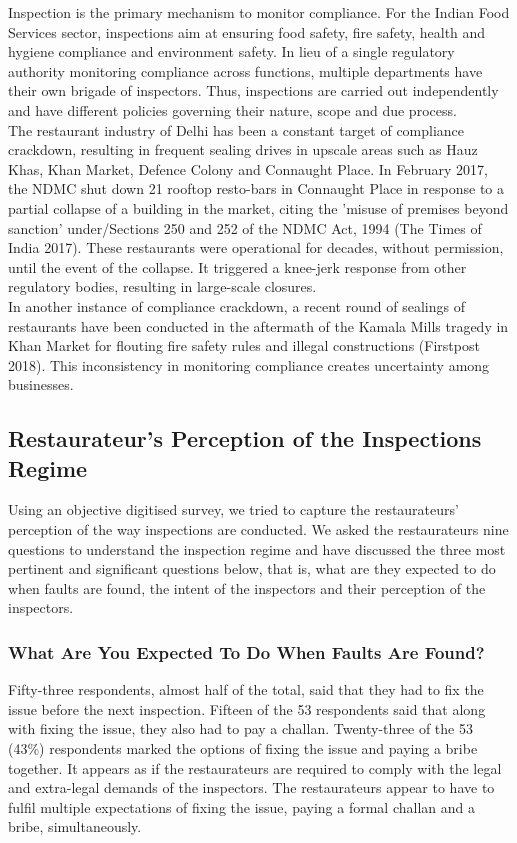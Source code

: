\documentclass[a4paper, 12pt]{article}
\begin{document}
		Inspection is the primary mechanism to monitor compliance. For the Indian Food Services sector, inspections aim at ensuring food safety, fire safety, health and hygiene compliance and environment safety. In lieu of a single regulatory authority monitoring compliance across functions, multiple departments have their own brigade of inspectors. Thus, inspections are carried out independently and have different policies governing their nature, scope and due process.\\
		The restaurant industry of Delhi has been a constant target of compliance crackdown, resulting in frequent sealing drives in upscale areas such as Hauz Khas, Khan Market, Defence Colony and Connaught Place. In February 2017, the NDMC shut down 21 rooftop resto-bars in Connaught Place in response to a partial collapse of a building in the market, citing the 'misuse of premises beyond sanction' under/Sections 250 and 252 of the NDMC Act, 1994 (The Times of India 2017). These restaurants were operational for decades, without permission, until the event of the collapse. It triggered a knee-jerk response from other regulatory bodies, resulting in large-scale closures.\\
		In another instance of compliance crackdown, a recent round of sealings of restaurants have been conducted in the aftermath of the Kamala Mills tragedy in Khan Market for flouting fire safety rules and illegal constructions (Firstpost 2018). This inconsistency in monitoring compliance creates uncertainty among businesses.
		
		\subsection{Restaurateur’s Perception of the Inspections Regime}
		Using an objective digitised survey, we tried to capture the restaurateurs’ perception of the way inspections are conducted. We asked the restaurateurs nine questions to understand the inspection regime and have discussed the three most pertinent and significant questions below, that is, what are they expected to do when faults are found, the intent of the inspectors and their perception of the inspectors.
		
		\subsubsection {What Are You Expected To Do When Faults Are Found?}
		Fifty-three respondents, almost half of the total, said that they had to fix the issue before the next inspection. Fifteen of the 53 respondents said that along with fixing the issue, they also had to pay a challan. Twenty-three of the 53 (43\%) respondents marked the options of fixing the issue and paying a bribe together. It appears as if the restaurateurs are required to comply with the legal and extra-legal demands of the inspectors. The restaurateurs appear to have to fulfil multiple expectations of fixing the issue, paying a formal challan and a bribe, simultaneously.
\end{document}
